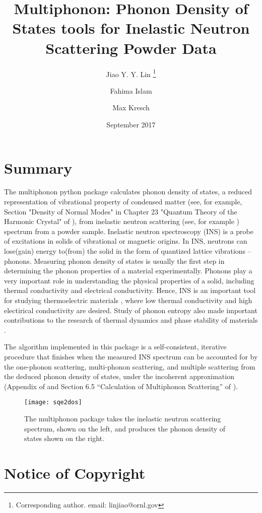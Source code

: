 \documentclass{article}
\title{Multiphonon: Phonon Density of States tools for Inelastic Neutron Scattering Powder Data}
\author[1]{Jiao Y. Y. Lin \thanks{Corresponding author. email: linjiao@ornl.gov}}
\author[1]{Fahima Islam}
\author[2]{Max Kresch}
\affil[1]{Neutron Scattering Division, Oak Ridge National Lab}
\affil[2]{mkresch@gmail.com}
\date{September 2017}
\begin{document}
\maketitle

\section{Summary}\label{summary}

The multiphonon python package calculates phonon density of states,
a reduced representation of vibrational property of condensed matter (see, for example,
Section "Density of Normal Modes" in
Chapter 23 "Quantum Theory of the Harmonic Crystal" of \cite{ashcroftmermin}),
from
inelastic neutron scattering (see, for example \cite{FultzINSbook})
spectrum from a powder sample.
Inelastic neutron spectroscopy (INS) is a probe of excitations in solids of
vibrational or magnetic origins.
In INS, neutrons can lose(gain) energy
to(from) the solid in the form of quantized lattice vibrations -- phonons.
Measuring phonon density of states is usually the first step
in determining the phonon properties of a material experimentally.
Phonons play a very important role in understanding the physical properties of a solid,
including thermal conductivity and electrical conductivity.
Hence, INS is an important tool for studying thermoelectric materials \cite{budai2014, lichen2015},
where
low thermal conductivity and high electirical conductivity are desired.
Study of phonon entropy also made important contributions to
the research of thermal dynamics and phase stability of materials
\cite{FULTZ2010, bogdanoff2002phonon, swan2006vibrational}.

The algorithm implemented in this package is a self-consistent,
iterative procedure that finishes when
the measured INS spectrum can be accounted for by
the one-phonon scattering, multi-phonon scattering, and multiple
scattering from the deduced phonon density of states, under the
incoherent approximation (Appendix of \cite{KreschNickel2007} and
Section 6.5 ``Calculation of Multiphonon Scattering'' of
\cite{FultzINSbook}).

\begin{figure}
  \texttt{[image: sqe2dos]}
  \caption{The multiphonon package takes the inelastic neutron scattering spectrum, shown on the left, and produces the phonon density of states shown on the right.}
\end{figure}


\section{Notice of Copyright}\label{notice-of-copyright}
\end{document}
